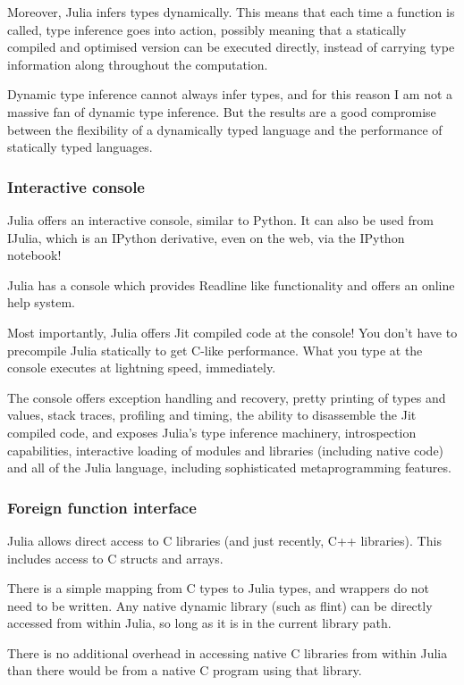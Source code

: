 \documentclass[a4paper,10pt]{article}
\begin{document}
Moreover, Julia infers types dynamically. This means that each time a function is called, type
inference goes into action, possibly meaning that a statically compiled and optimised version
can be executed directly, instead of carrying type information along throughout the 
computation.

Dynamic type inference cannot always infer types, and for this reason I am not a massive fan of
dynamic type inference. But the results are a good compromise between the flexibility of a 
dynamically typed language and the performance of statically typed languages.

\subsubsection{Interactive console}

Julia offers an interactive console, similar to Python. It can also be used from IJulia, which
is an IPython derivative, even on the web, via the IPython notebook!

Julia has a console which provides Readline like functionality and offers an online help 
system.

Most importantly, Julia offers Jit compiled code at the console! You don't have to precompile
Julia statically to get C-like performance. What you type at the console executes at lightning
speed, immediately.

The console offers exception handling and recovery, pretty printing of types and values, stack 
traces, profiling and timing, the ability to disassemble the Jit compiled code, and exposes 
Julia's type inference machinery, introspection capabilities, interactive loading of modules 
and libraries (including native code) and all of the Julia language, including sophisticated 
metaprogramming features. 

\subsubsection{Foreign function interface}

Julia allows direct access to C libraries (and just recently, C++ libraries). This includes
access to C structs and arrays.

There is a simple mapping from C types to Julia types, and wrappers do not need to be written.
Any native dynamic library (such as flint) can be directly accessed from within Julia, so long
as it is in the current library path.

There is no additional overhead in accessing native C libraries from within Julia than there
would be from a native C program using that library.
\end{document}

